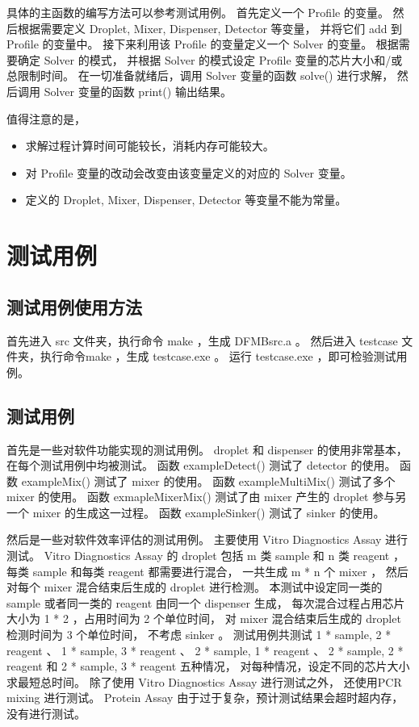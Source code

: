 \documentclass[UTF8, a4paper, titlepage]{ctexart}
\begin{document}
具体的主函数的编写方法可以参考测试用例。%
首先定义一个 Profile 的变量。%
然后根据需要定义 Droplet, Mixer, Dispenser, Detector 等变量，%
并将它们 add 到 Profile 的变量中。%
接下来利用该 Profile 的变量定义一个 Solver 的变量。%
根据需要确定 Solver 的模式，%
并根据 Solver 的模式设定 Profile 变量的芯片大小和/或总限制时间。%
在一切准备就绪后，调用 Solver 变量的函数 solve() 进行求解，%
然后调用 Solver 变量的函数 print() 输出结果。%

值得注意的是，
\begin{itemize}
	\item 求解过程计算时间可能较长，消耗内存可能较大。%
	\item 对 Profile 变量的改动会改变由该变量定义的对应的 Solver 变量。%
	\item 定义的 Droplet, Mixer, Dispenser, Detector 等变量不能为常量。%
\end{itemize}

\section{测试用例}
\subsection{测试用例使用方法}
首先进入 src 文件夹，执行命令 make ，生成 DFMBsrc.a 。%
然后进入 testcase 文件夹，执行命令make ，生成 testcase.exe 。%
运行 testcase.exe ，即可检验测试用例。%
\subsection{测试用例}
首先是一些对软件功能实现的测试用例。%
droplet 和 dispenser 的使用非常基本，在每个测试用例中均被测试。%
函数 exampleDetect() 测试了 detector 的使用。%
函数 exampleMix() 测试了 mixer 的使用。%
函数 exampleMultiMix() 测试了多个 mixer 的使用。%
函数 exmapleMixerMix() 测试了由 mixer 产生的 droplet 参与另一个 mixer 的生成这一过程。%
函数 exampleSinker() 测试了 sinker 的使用。%

然后是一些对软件效率评估的测试用例。%
主要使用 Vitro Diagnostics Assay 进行测试。%
Vitro Diagnostics Assay 的 droplet 包括 m 类 sample 和 n 类 reagent ，%
每类 sample 和每类 reagent 都需要进行混合，%
一共生成 m * n 个 mixer ，%
然后对每个 mixer 混合结束后生成的 droplet 进行检测。%
本测试中设定同一类的 sample 或者同一类的 reagent 由同一个 dispenser 生成，%
每次混合过程占用芯片大小为 1 * 2 ，占用时间为 2 个单位时间，%
对 mixer 混合结束后生成的 droplet 检测时间为 3 个单位时间，%
不考虑 sinker 。%
测试用例共测试 1 * sample, 2 * reagent 、 %
1 * sample, 3 * reagent 、 %
2 * sample, 1 * reagent 、 %
2 * sample, 2 * reagent 和 %
2 * sample, 3 * reagent 五种情况，%
对每种情况，设定不同的芯片大小求最短总时间。%
除了使用 Vitro Diagnostics Assay 进行测试之外，%
还使用PCR mixing 进行测试。%
Protein Assay 由于过于复杂，预计测试结果会超时超内存，没有进行测试。%
\end{document}
